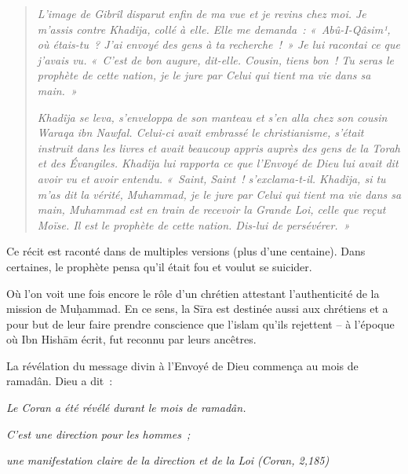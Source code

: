 \begin{quotation}
\emph{L'image de Gibrîl disparut enfin de ma vue et je revins chez moi.
Je m'assis contre Khadîja, collé à elle. Elle me demanda~:
«~Abû-I-Qâsim¹, où étais-tu~? J'ai envoyé des gens à ta recherche~!~» Je
lui racontai ce que j'avais vu. «~C'est de bon augure, dit-elle. Cousin,
tiens bon~! Tu seras le prophète de cette nation, je le jure par Celui
qui tient ma vie dans sa main.~»}

\emph{Khadîja se leva, s'enveloppa de son manteau et s'en alla chez son
cousin Waraqa ibn Nawfal. Celui-ci avait embrassé le christianisme,
s'était instruit dans les livres et avait beaucoup appris auprès des
gens de la Torah et des Évangiles. Khadîja lui rapporta ce que l'Envoyé
de Dieu lui avait dit avoir vu et avoir entendu. «~Saint, Saint~!
s'exclama-t-il. Khadîja, si tu m'as dit la vérité, Muhammad, je le jure
par Celui qui tient ma vie dans sa main, Muhammad est en train de
recevoir la Grande Loi, celle que reçut Moïse. Il est le prophète de
cette nation. Dis-lui de persévérer.~»}
\end{quotation}
Ce récit est raconté dans de multiples versions (plus d'une centaine).
Dans certaines, le prophète pensa qu'il était fou et voulut se suicider.

Où l'on voit une fois encore le rôle d'un chrétien attestant
l'authenticité de la mission de Muḥammad. En ce sens, la Sīra est
destinée aussi aux chrétiens et a pour but de leur faire prendre
conscience que l'islam qu'ils rejettent -- à l'époque où Ibn Hishām
écrit, fut reconnu par leurs ancêtres.



La révélation du message divin à l'Envoyé de Dieu commença au mois de
ramadân. Dieu a dit~:

\emph{Le Coran a été révélé durant le mois de ramadân.}

\emph{C'est une direction pour les hommes~;}

\emph{une manifestation claire de la direction et de la Loi (Coran,
2,185)}


